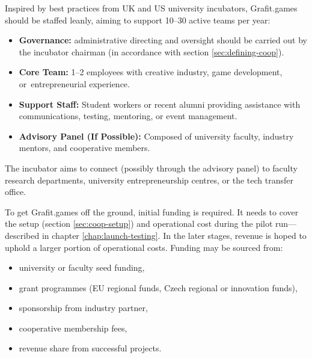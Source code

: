 Inspired by best practices from UK and US university incubators\cite{isis-innovation}, Grafit.games should be staffed leanly, aiming to support 10–30 active teams per year:
\begin{itemize}
    \item \textbf{Governance:} administrative directing and oversight should be carried out by the incubator chairman (in accordance with section \ref{sec:defining-coop}).
    \item \textbf{Core Team:} 1--2 employees with creative industry, game development, or~entrepreneurial experience.
    \item \textbf{Support Staff:} Student workers or recent alumni providing assistance with communications, testing, mentoring, or event management.
    \item \textbf{Advisory Panel (If Possible):} Composed of university faculty, industry mentors, and cooperative members.
\end{itemize}
The incubator aims to connect (possibly through the advisory panel) to faculty research departments, university entrepreneurship centres, or the tech transfer office.

To get Grafit.games off the ground, initial funding is required\cite{strategy-incubation}. It needs to cover the setup (section \ref{sec:coop-setup}) and operational cost during the pilot run---described in chapter \ref{chap:launch-testing}. In the later stages, revenue is hoped to uphold a larger portion of operational costs. Funding may be sourced from:
\begin{itemize}
    \item university or faculty seed funding,
    \item grant programmes (EU regional funds, Czech regional or innovation funds),
    \item sponsorship from industry partner,
    \item cooperative membership fees,
    \item revenue share from successful projects.
\end{itemize}

